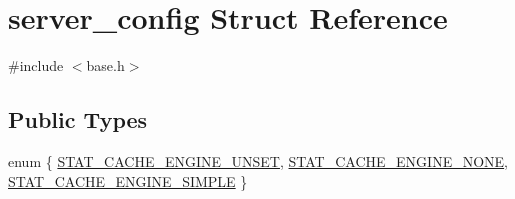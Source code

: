 \hypertarget{structserver__config}{\section{server\-\_\-config Struct Reference}
\label{structserver__config}
}


{\ttfamily \#include $<$base.\-h$>$}

\subsection*{Public Types}
\begin{DoxyCompactItemize}
\item 
enum \{ \hyperlink{structserver__config_a6632de6dd8e891482608ebc7a2356153a3871daf8d27fd0b1444b526f75193c21}{S\-T\-A\-T\-\_\-\-C\-A\-C\-H\-E\-\_\-\-E\-N\-G\-I\-N\-E\-\_\-\-U\-N\-S\-E\-T}, 
\hyperlink{structserver__config_a6632de6dd8e891482608ebc7a2356153ac23a3e77bf209823d285398828cc6234}{S\-T\-A\-T\-\_\-\-C\-A\-C\-H\-E\-\_\-\-E\-N\-G\-I\-N\-E\-\_\-\-N\-O\-N\-E}, 
\hyperlink{structserver__config_a6632de6dd8e891482608ebc7a2356153a5856daed9ad3907de3e7058ff5f46284}{S\-T\-A\-T\-\_\-\-C\-A\-C\-H\-E\-\_\-\-E\-N\-G\-I\-N\-E\-\_\-\-S\-I\-M\-P\-L\-E}
 \}
\end{DoxyCompactItemize}
